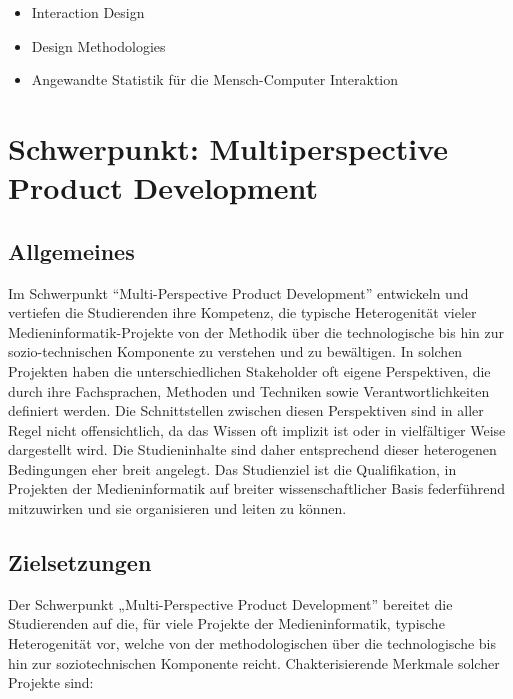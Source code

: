 \begin{itemize}
\tightlist
\item
  Interaction Design
\item
  Design Methodologies
\item
  Angewandte Statistik für die Mensch-Computer Interaktion
\end{itemize}

\chapter{Schwerpunkt: Multiperspective Product
Development}\label{schwerpunkt-multiperspective-product-development}

\section*{Allgemeines}\label{allgemeines-1}

Im Schwerpunkt ``Multi-Perspective Product Development'' entwickeln und
vertiefen die Studierenden ihre Kompetenz, die typische Heterogenität
vieler Medieninformatik-Projekte von der Methodik über die
technologische bis hin zur sozio-technischen Komponente zu verstehen und
zu bewältigen. In solchen Projekten haben die unterschiedlichen
Stakeholder oft eigene Perspektiven, die durch ihre Fachsprachen,
Methoden und Techniken sowie Verantwortlichkeiten definiert werden. Die
Schnittstellen zwischen diesen Perspektiven sind in aller Regel nicht
offensichtlich, da das Wissen oft implizit ist oder in vielfältiger
Weise dargestellt wird. Die Studieninhalte sind daher entsprechend
dieser heterogenen Bedingungen eher breit angelegt. Das Studienziel ist
die Qualifikation, in Projekten der Medieninformatik auf breiter
wissenschaftlicher Basis federführend mitzuwirken und sie organisieren
und leiten zu können.

\section*{Zielsetzungen}\label{zielsetzungen-1}

Der Schwerpunkt „Multi-Perspective Product Development'' bereitet die
Studierenden auf die, für viele Projekte der Medieninformatik, typische
Heterogenität vor, welche von der methodologischen über die
technologische bis hin zur soziotechnischen Komponente reicht.
Chakterisierende Merkmale solcher Projekte sind:

